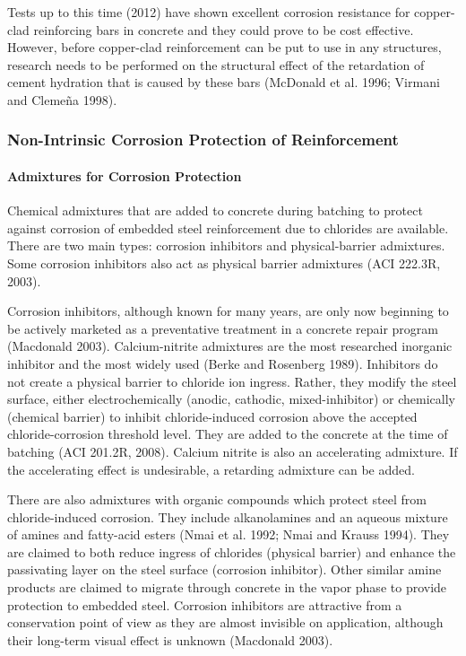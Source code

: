 Tests up to this time (2012) have shown excellent corrosion resistance for copper-clad reinforcing bars in concrete and they could prove to be cost effective. However, before copper-clad reinforcement can be put to use in any structures, research needs to be performed on the structural effect of the retardation of cement hydration that is caused by these bars (McDonald et al. 1996; Virmani and Clemeña 1998).


\subsubsection{Non-Intrinsic Corrosion Protection of Reinforcement}

\paragraph{Admixtures for Corrosion Protection}
Chemical admixtures that are added to concrete during batching to protect against corrosion of embedded steel reinforcement due to chlorides are available. There are two main types: corrosion inhibitors and physical-barrier admixtures. Some corrosion inhibitors also act as physical barrier admixtures (ACI 222.3R, 2003).

Corrosion inhibitors, although known for many years, are only now beginning to be actively marketed as a preventative treatment in a concrete repair program (Macdonald 2003). Calcium-nitrite admixtures are the most researched inorganic inhibitor and the most widely used (Berke and Rosenberg 1989). Inhibitors do not create a physical barrier to chloride ion ingress. Rather, they modify the steel surface, either electrochemically (anodic, cathodic, mixed-inhibitor) or chemically (chemical barrier) to inhibit chloride-induced corrosion above the accepted chloride-corrosion threshold level. They are added to the concrete at the time of batching (ACI 201.2R, 2008). Calcium nitrite is also an accelerating admixture. If the accelerating effect is undesirable, a retarding admixture can be added.

There are also admixtures with organic compounds which protect steel from chloride-induced corrosion. They include alkanolamines and an aqueous mixture of amines and fatty-acid esters (Nmai et al. 1992; Nmai and Krauss 1994). They are claimed to both reduce ingress of chlorides (physical barrier) and enhance the passivating layer on the steel surface (corrosion inhibitor). Other similar amine products are claimed to migrate through concrete in the vapor phase to provide protection to embedded steel. Corrosion inhibitors are attractive from a conservation point of view as they are almost invisible on application, although their long-term visual effect is unknown (Macdonald 2003).

